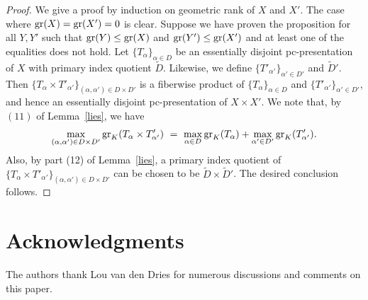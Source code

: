 \begin{proof}

We give a proof by induction on geometric rank of $X$ and $X'$. The case where $\mathrm{gr}(X)=\mathrm{gr}(X')=0$ is clear. Suppose we have proven the proposition for all $Y, Y'$ such that $\mathrm{gr}(Y)\leq \mathrm{gr}(X)$ and $\mathrm{gr}(Y') \leq \mathrm{gr}(X')$ and at least one of the equalities does not hold.  Let $\{T_\alpha\}_{ \alpha \in D}$ be an essentially disjoint pc-presentation of $X$ with primary index quotient $\widetilde{D}$. Likewise, we define $\{T'_{\alpha'}\}_{ \alpha' \in D'}$ and $\widetilde{D}'$. Then $\{T_\alpha \times T'_{\alpha'}\}_{ (\alpha, \alpha') \in D\times D'}$ is a fiberwise product of $\{T_\alpha\}_{ \alpha \in D}$ and  $\{T'_{\alpha'}\}_{ \alpha' \in D'}$, and hence an essentially disjoint pc-presentation of $X \times X'$. We note that, by $(11)$ of Lemma~\ref{lies}, we have 
$$\max_{(\alpha, \alpha') \in D\times D'}\mathrm{gr}_K(T_\alpha \times T'_{\alpha'})\ =\ \max_{\alpha\in D} \mathrm{gr}_K(T_\alpha) +  \max_{\alpha' \in D'} \mathrm{gr}_K(T'_{\alpha'}).$$
Also, by part (12) of Lemma~\ref{lies}, a primary index quotient of $\{T_\alpha \times T'_{\alpha'}\}_{ (\alpha, \alpha') \in D\times D'}$ can be chosen to be $\widetilde{D} \times \widetilde{D}'$. The desired conclusion follows.
\end{proof}

\section*{Acknowledgments}
\noindent
The authors thank Lou van den Dries for numerous discussions and comments on this paper.